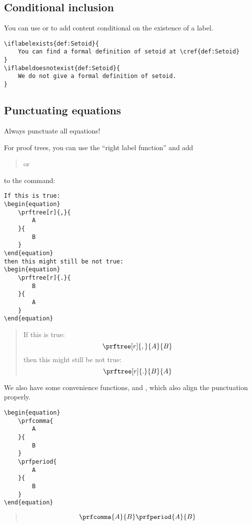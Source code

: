 \subsection{Conditional inclusion}

You can use  or   to add content conditional on the existence of a label.

\begin{verbatim}
\iflabelexists{def:Setoid}{
    You can find a formal definition of setoid at \cref{def:Setoid}
}
\iflabeldoesnotexist{def:Setoid}{
    We do not give a formal definition of setoid.
}
\end{verbatim}

\subsection{Punctuating equations}

Always punctuate all equations!

For proof trees, you can use the ``right label function'' and add
%
\begin{quote}
	\centering
	\str{[r]{,}} \qquad or \qquad {}
\end{quote}
%
to the  command:
%
\begin{verbatim}
If this is true:
\begin{equation}
    \prftree[r]{,}{
        A
    }{
        B
    }
\end{equation}
then this might still be not true:
\begin{equation}
    \prftree[r]{.}{
        B
    }{
        A
    }
\end{equation}
\end{verbatim}
\begin{quote}
	If this is true:
	\begin{equation}
		\prftree[r]{,}{
			A
		}{
			B
		}
	\end{equation}
	then this might still be not true:
	\begin{equation}
		\prftree[r]{.
		}{
			B
		}{
			A
		}
	\end{equation}
\end{quote}

We also have some convenience functions, \str{\\prfperiod} and \str{\\prfcomma},
which also align the punctuation properly.

\begin{verbatim}
\begin{equation}
    \prfcomma{
        A
    }{
        B
    }
    \prfperiod{
        A
    }{
        B
    }
\end{equation}
\end{verbatim}
\begin{quote}
	\begin{equation}
		\prfcomma{
			A
		}{
			B
		}
		\prfperiod{
			A
		}{
			B
		}
	\end{equation}
\end{quote}

